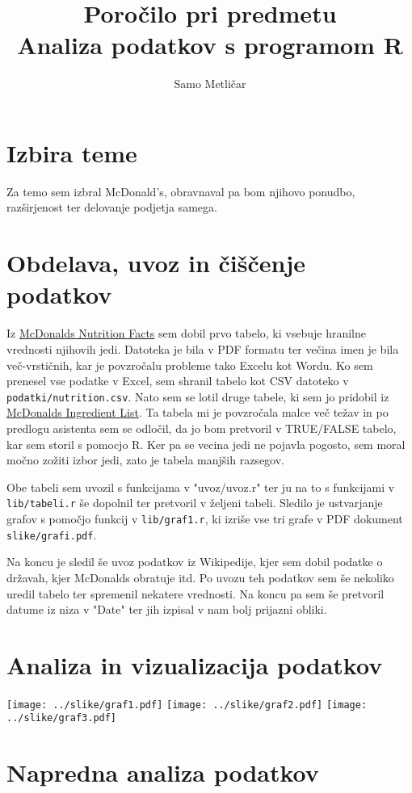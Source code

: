 \documentclass[11pt,a4paper]{article}
\begin{document}
\title{Poročilo pri predmetu \\
Analiza podatkov s programom R}
\author{Samo Metličar}
\maketitle

\section{Izbira teme}

Za temo sem izbral McDonald's, obravnaval pa bom njihovo ponudbo, razširjenost ter delovanje podjetja samega.

\section{Obdelava, uvoz in čiščenje podatkov}

Iz \href{http://nutrition.mcdonalds.com/getnutrition/nutritionfacts.pdf}{McDonalds Nutrition Facts} sem dobil prvo tabelo, ki vsebuje hranilne vrednosti njihovih jedi. Datoteka je bila v PDF formatu ter večina imen je bila več-vrstičnih, kar je povzročalu probleme tako Excelu kot Wordu. Ko sem prenesel vse podatke v Excel, sem shranil tabelo kot CSV datoteko v \verb|podatki/nutrition.csv|. Nato sem se lotil druge tabele, ki sem jo pridobil iz \href{http://nutrition.mcdonalds.com/getnutrition/ingredientslist.pdf}{McDonalds Ingredient List}. Ta tabela mi je povzročala malce več težav in po predlogu asistenta sem se odločil, da jo bom pretvoril v TRUE/FALSE tabelo, kar sem storil s pomocjo R. Ker pa se vecina jedi ne pojavla pogosto, sem moral močno zožiti izbor jedi, zato je tabela manjših razsegov. \par

Obe tabeli sem uvozil s funkcijama v "uvoz/uvoz.r" ter ju na to s funkcijami v \verb|lib/tabeli.r| še dopolnil ter pretvoril v željeni tabeli. Sledilo je ustvarjanje grafov s pomočjo funkcij v \verb|lib/graf1.r|, ki izriše vse tri grafe v PDF dokument \verb|slike/grafi.pdf|. \par

Na koncu je sledil še uvoz podatkov iz Wikipedije, kjer sem dobil podatke o državah, kjer McDonalds obratuje itd. Po uvozu teh podatkov sem še nekoliko uredil tabelo ter spremenil nekatere vrednosti. Na koncu pa sem še pretvoril datume iz niza v "Date" ter jih izpisal v nam bolj prijazni obliki.

\section{Analiza in vizualizacija podatkov}

\texttt{[image: ../slike/graf1.pdf]}
\texttt{[image: ../slike/graf2.pdf]}
\texttt{[image: ../slike/graf3.pdf]}

\section{Napredna analiza podatkov}
\end{document}
